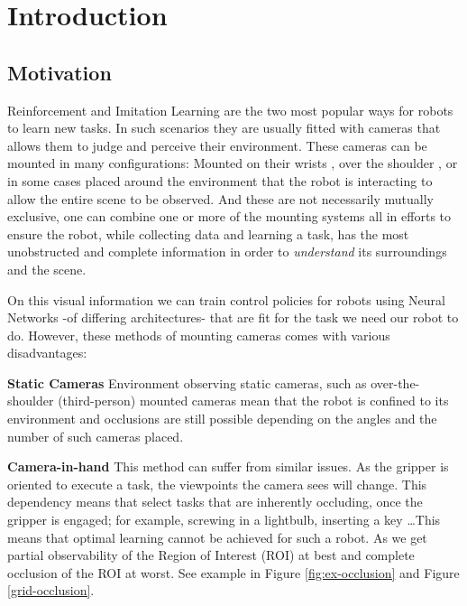 \chapter{Introduction}
\section{Motivation}
    

  Reinforcement and Imitation Learning are the two most popular ways for robots to learn new tasks. In such scenarios they are usually fitted with cameras that allows them to judge and perceive their environment. These cameras can be mounted in many configurations: Mounted on their wrists \cite{chi2024UMIinthewild,openXEmbodimentRoboticLearning2024}, over the shoulder \cite{wang2024observeactasynchronousactive}, or in some cases placed around the environment \cite{exploringActiveVision2024chuang} that the robot is interacting to allow the entire scene to be observed. And these are not necessarily mutually exclusive, one can combine one or more of the mounting systems \cite{exploringActiveVision2024chuang} all in efforts to ensure the robot, while collecting data and learning a task, has the most unobstructed and complete information in order to \emph{understand} its surroundings and the scene.

  On this visual information we can train control policies for robots using Neural Networks \cite{spyros1995nnStateOfTheArt, Schmidhuber2015nn} -of differing architectures- that are fit for the task we need our robot to do. However, these methods of mounting cameras comes with various disadvantages:
  
  \textbf{Static Cameras} Environment observing static cameras, such as over-the-shoulder (third-person) mounted cameras mean that the robot is confined to its environment and occlusions are still possible depending on the angles and the number of such cameras placed.
    
  \textbf{Camera-in-hand} This method can suffer from similar issues. As the gripper is oriented to execute a task, the viewpoints the camera sees will change. This dependency means that select tasks that are inherently occluding, once the gripper is engaged; for example, screwing in a lightbulb, inserting a key \ldots This means that optimal learning cannot be achieved for such a robot. As we get partial observability of the Region of Interest (ROI) at best and complete occlusion of the ROI at worst. See example in Figure \ref{fig:ex-occlusion} and Figure \ref{grid-occlusion}.

